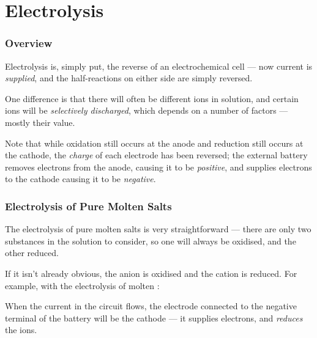 

\pagebreak
\part{Electrolysis}

	\section{Overview}

		Electrolysis is, simply put, the reverse of an electrochemical cell --- now current is \textit{supplied}, and the half-reactions
		on either side are simply reversed.

		One difference is that there will often be different ions in solution, and certain ions will be \textit{selectively discharged}, which
		depends on a number of factors --- mostly their \Eo{} value.

		Note that while oxidation still occurs at the anode and reduction still occurs at the cathode, the \textit{charge} of each
		electrode has been reversed; the external battery removes electrons from the anode, causing it to be \textit{positive}, and
		supplies electrons to the cathode causing it to be \textit{negative}.


	\section{Electrolysis of Pure Molten Salts}

		The electrolysis of pure molten salts is very straightforward --- there are only two substances in the solution to consider, so one will
		always be oxidised, and the other reduced.

		If it isn't already obvious, the anion is oxidised and the cation is reduced. For example, with the electrolysis of molten :


		When the current in the circuit flows, the electrode connected to the negative terminal of the battery will be the cathode --- it supplies
		electrons, and \textit{reduces} the  ions.

